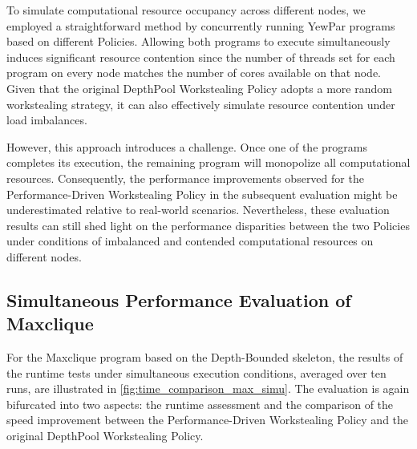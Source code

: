 \documentclass{mproj}
\begin{document}
To simulate computational resource occupancy across different nodes,
we employed a straightforward method by concurrently running YewPar programs based on different Policies.
Allowing both programs to execute simultaneously induces significant resource contention since the number of threads set for each program on every node matches the number of cores available on that node.
Given that the original DepthPool Workstealing Policy adopts a more random workstealing strategy, it can also effectively simulate resource contention under load imbalances.

However, this approach introduces a challenge.
Once one of the programs completes its execution, the remaining program will monopolize all computational resources.
Consequently, the performance improvements observed for the Performance-Driven Workstealing Policy in the subsequent evaluation might be underestimated relative to real-world scenarios.
Nevertheless, these evaluation results can still shed light on the performance disparities between the two Policies under conditions of imbalanced and contended computational resources on different nodes.

\subsection{Simultaneous Performance Evaluation of Maxclique}

For the Maxclique program based on the Depth-Bounded skeleton, the results of the runtime tests under simultaneous execution conditions, averaged over ten runs, are illustrated in \cref{fig:time_comparison_max_simu}.
The evaluation is again bifurcated into two aspects: the runtime assessment and the comparison of the speed improvement between the Performance-Driven Workstealing Policy and the original DepthPool Workstealing Policy.
\end{document}
